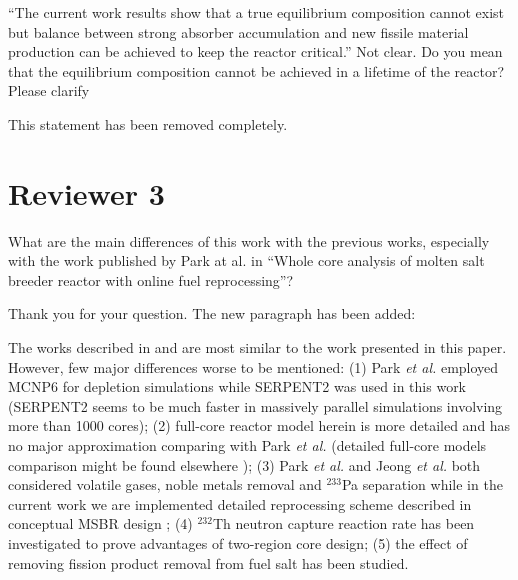 \documentclass[answers,11pt]{exam}
\begin{document}
\begin{questions}



        \question ``The current work results show that a true equilibrium 
        composition cannot exist but balance between strong absorber 
        accumulation and new fissile material production can be achieved to 
        keep the reactor critical.'' Not clear. Do you mean that the equilibrium 
        composition cannot be achieved in a lifetime of the reactor? Please 
        clarify
        \begin{solution}
                This statement has been removed completely.
        \end{solution}







        \section*{Reviewer 3}


        \question  What are the main differences of this work with the previous 
        works, especially with the work published by Park at al. in ``Whole core 
        analysis of molten salt breeder reactor with online fuel reprocessing''?
        \begin{solution}
                Thank you for your question. The new paragraph has been added:
                
                The works described in \cite{park_whole_2015} and 
                \cite{jeong_equilibrium_2016} are most similar to the work 
                presented in this paper. However, few major differences worse to 
                be mentioned: (1) Park \emph{et al.} employed MCNP6 for depletion 
				simulations while SERPENT2 was used in this work (SERPENT2 seems 
				to be much faster in massively parallel simulations involving more 
				than 1000 cores); (2) full-core reactor model herein is more 
				detailed and has no major approximation comparing with Park \emph{et al.}
				(detailed full-core models comparison might be found elsewhere
				\cite{rykhlevskii_full-core_2017}); (3) Park \emph{et al.} and 
				Jeong \emph{et al.} both considered volatile gases, noble metals 
				removal and $^{233}$Pa separation while in the current work we are 
				implemented detailed reprocessing scheme described in conceptual 
				MSBR design \cite{robertson_conceptual_1971}; (4) $^{232}$Th 
				neutron capture reaction rate has been investigated to prove 
				advantages of two-region core design; (5) the effect of removing 
				fission product removal from fuel salt has been studied. 
        \end{solution}


\end{questions}
\end{document}
